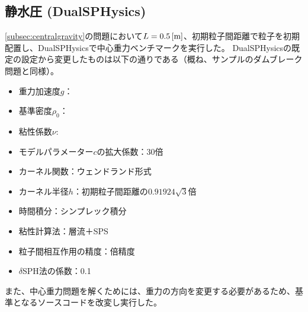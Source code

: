 	\subsection{静水圧 (DualSPHysics) \label{subsec:density}}
		\cref{subsec:centralgravity}の問題において$L=\SI{0.5}{[m]}$、初期粒子間距離で粒子を初期配置し、DualSPHysicsで中心重力ベンチマークを実行した。
		DualSPHysicsの既定の設定から変更したものは以下の通りである（概ね、サンプルのダムブレーク問題と同様）。
		\begin{itemize}
			\item 重力加速度$g$：
			\item 基準密度$\rho_0$：
			\item 粘性係数$\nu$: 
			\item モデルパラメーター$c$の拡大係数：30倍
			\item カーネル関数：ウェンドランド形式
			\item カーネル半径$h$：初期粒子間距離の$0.91924 \sqrt{3}$倍
			\item 時間積分：シンプレック積分
			\item 粘性計算法：層流＋SPS
			\item 粒子間相互作用の精度：倍精度
			\item $\delta$SPH法の係数：0.1
		\end{itemize}
		また、中心重力問題を解くためには、重力の方向を変更する必要があるため、基準となるソースコードを改変し実行した。

